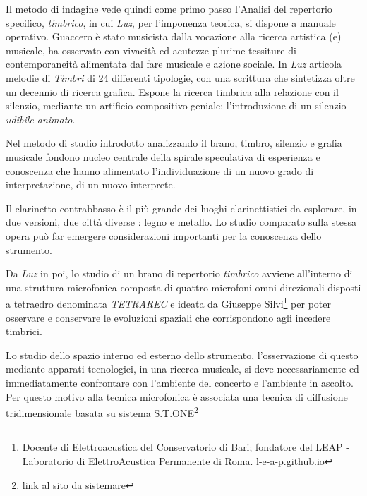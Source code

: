 \documentclass{gs-adonis}
\begin{document}

Il metodo di indagine vede quindi come primo passo l'Analisi del repertorio
specifico, \emph{timbrico}, in cui \emph{Luz}, per l'imponenza teorica, si
dispone a manuale operativo. Guaccero è stato musicista dalla vocazione alla
ricerca artistica (e) musicale, ha osservato con vivacità ed acutezze plurime
tessiture di contemporaneità alimentata dal fare musicale e azione sociale.
In \emph{Luz} articola melodie di \emph{Timbri} di 24 differenti tipologie, con
una scrittura che sintetizza oltre un decennio di ricerca grafica. Espone la
ricerca timbrica alla relazione con il silenzio, mediante un artificio
compositivo geniale: l'introduzione di un silenzio \emph{udibile animato}.

Nel metodo di studio introdotto analizzando il brano, timbro, silenzio e grafia
musicale fondono nucleo centrale della spirale speculativa di esperienza e
conoscenza che hanno alimentato l'individuazione di un nuovo grado di
interpretazione, di un nuovo interprete.

Il clarinetto contrabbasso è il più grande dei luoghi clarinettistici da esplorare,
in due versioni, due città diverse \cite{netti23}: legno e metallo. Lo studio
comparato sulla stessa opera può far emergere considerazioni importanti per la
conoscenza dello strumento.

Da \emph{Luz} in poi, lo studio di un brano di repertorio \emph{timbrico}
avviene all'interno di una struttura microfonica composta di quattro microfoni
omni-direzionali disposti a tetraedro denominata \emph{TETRAREC} e ideata da
Giuseppe Silvi\footnote{%
  Docente di Elettroacustica del Conservatorio di Bari; fondatore del LEAP -
  Laboratorio di ElettroAcustica Permanente di Roma.
  \url{l-e-a-p.github.io}
} per poter osservare e conservare le evoluzioni spaziali che corrispondono agli
incedere timbrici.

Lo studio dello spazio interno ed esterno dello strumento, l'osservazione di
questo mediante apparati tecnologici, in una ricerca musicale, si deve
necessariamente ed immediatamente confrontare con l'ambiente del concerto e
l'ambiente in ascolto. Per questo motivo alla tecnica microfonica è associata
una tecnica di diffusione tridimensionale basata su sistema S.T.ONE\footnote{%
  link al sito da sistemare
}
\end{document}
